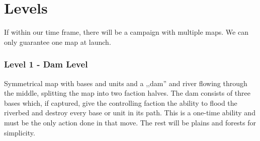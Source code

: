 \part{Levels}

If within our time frame, there will be a campaign with multiple maps. We can only guarantee one map at launch.
\section{Level 1 - Dam Level}
\label{level}
Symmetrical map with bases and units  and a ,,dam'' and river flowing through the middle, splitting the map into two faction halves.
The dam consists of three bases which, if captured, give the controlling faction the ability to flood the riverbed and destroy every base
or unit  in its path. This is a one-time ability and must be the only action done in that move. The rest will be plains and forests for simplicity.
